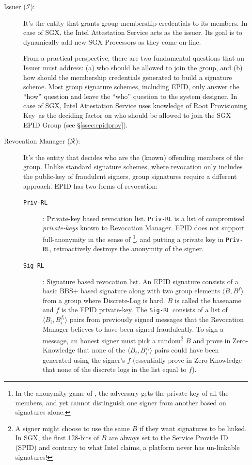 \documentclass[letterpaper]{article}
\newcommand{\secref}[1]{\S\ref{#1}}
\newcommand{\rpk}{\textsf{Root Provisioning Key}}
\begin{document}
  \begin{description}
  \item [Issuer ($\mathcal{I}$):] It's the entity that grants group membership credentials to its members. In case of SGX, the Intel Attestation Service acts as the issuer. Its goal is to dynamically add new SGX Processors as they come on-line. 

    From a practical perspective, there are two fundamental questions that an Issuer must address: (a) who should be allowed to join the group, and (b) how should the membership credentials generated to build a signature scheme. Most group signature schemes, including EPID, only answer the ``how'' question and leave the ``who'' question to the system designer. In case of SGX, Intel Attestation Service uses knowledge of \rpk\ as the deciding factor on who should be allowed to join the SGX EPID Group (see \secref{ssec:epidprov}).

  \item[Revocation Manager ($\mathcal{R}$):] It's the entity that decides who are the (known) offending members of the group. Unlike standard signature schemes, where revocation only includes the public-key of fraudulent signers, group signatures require a different approach. EPID has two forms of revocation:

    \begin{description}
    \item[\texttt{Priv-RL}]: Private-key based revocation list.
      \texttt{Priv-RL} is a list of compromised \textit{private-keys} known to Revocation Manager. EPID does not support full-anonymity in the sense of \cite{BMW03}\footnote{In the \textsf{anonymity} game of \cite{BMW03}, the adversary gets the private key of all the
        members, and yet cannot distinguish one signer from another
        based on signatures alone.}, and
      putting a private key in \texttt{Priv-RL}, retroactively destroys
      the anonymity of the signer.
      
      \item[\texttt{Sig-RL}]: Signature based revocation list. An EPID
        signature consists of a basic BBS+ \cite{bbsplus, bbs} based
        signature along with two group elements $\langle B, B^f
        \rangle$ from a group where Discrete-Log is hard. $B$ is
        called the basename and $f$ is the EPID private-key. The
        \texttt{Sig-RL} consists of a list of $\langle B_i, B_i^{f_i}
        \rangle$ pairs from previously signed messages that the 
        Revocation Manager believes to have been signed fraudulently. To sign a message, an honest signer must pick a random\footnote{A signer might choose to use the same $B$ if they want signatures to be linked. In SGX, the first 128-bits of $B$ are always set to the Service Provide ID (SPID) \cite{ias} and contrary to what Intel claims, a platform never has un-linkable signatures!} $B$ and prove in Zero-Knowledge that none of the $\langle B_i, B_i^{f_i} \rangle$ pairs could have been generated using the signer's $f$ (essentially prove in Zero-Knowledge that none of the discrete logs in the list equal to $f$). 


\end{description}
\end{description}
\end{document}
